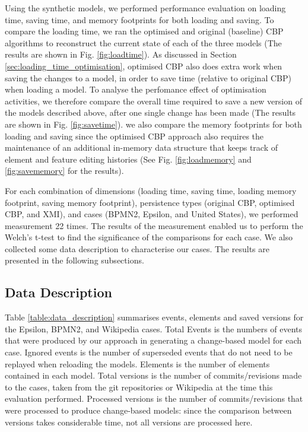 \documentclass{llncs}
\begin{document}
    Using the synthetic models, we performed performance evaluation on loading time, saving time, and memory footprints for both loading and saving. To compare the loading time, we ran the optimised and original (baseline) CBP algorithms to reconstruct the current state of each of the three models (The results are shown in Fig. \ref{fig:loadtime}). As discussed in Section \ref{sec:loading_time_optimisation}, optimised CBP also does extra work when saving the changes to a model, in order to save time (relative to original CBP) when loading a model. To analyse the perfomance effect of optimisation activities, we therefore compare the overall time required to save a new version of the models described above, after one single change has been made (The results are shown in Fig. \ref{fig:savetime}). we also compare the memory footprints for both loading and saving since the optimised CBP approach also requires the maintenance of an additional in-memory data structure that keeps track of element and feature editing histories (See Fig. \ref{fig:loadmemory} and \ref{fig:savememory} for the results). 
    
    For each combination of dimensions (loading time, saving time, loading memory footprint, saving memory footprint),  persistence types (original CBP, optimised CBP, and XMI), and cases (BPMN2, Epsilon, and United States), we performed measurement 22 times. The results of the measurement enabled us to perform the Welch's t-test to find the significance of the comparisons for each case. We also collected some data description to characterise our cases. The results are presented in the following subsections.

\subsection{Data Description}
\label{subsec:data_description}

Table \ref{table:data_description} summarises events, elements and saved versions for the Epsilon, BPMN2, and Wikipedia cases. Total Events is the numbers of events that were produced by our approach in generating a change-based model for each case.  Ignored events is the number of superseded events that do not need to be replayed when reloading the models. Elements is the number of elements contained in each model. Total versions is the number of commits/revisions made to the cases, taken from the git repositories or Wikipedia at the time this evaluation performed. Processed versions is the number of commits/revisions that were processed to produce change-based models: since the comparison between versions takes considerable time, not all versions are processed here.
\end{document}
